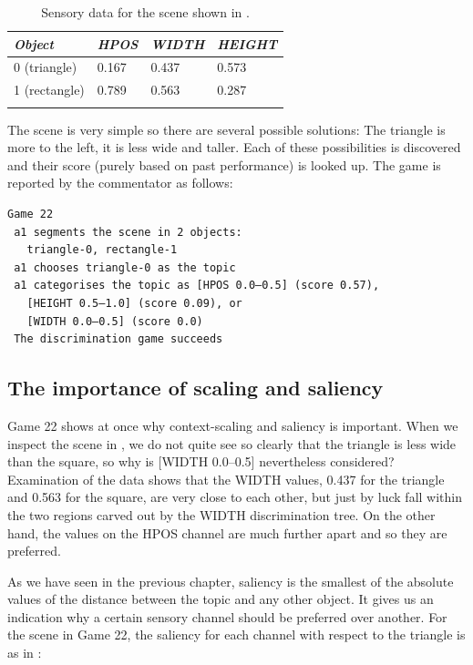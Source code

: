 \begin{table}
\begin{center}
\begin{tabular}{ l  l  l  l }
\lsptoprule
{\itshape Object} & {\itshape HPOS} & {\itshape WIDTH} & {\itshape HEIGHT} \\ \midrule
0 (triangle) & 0.167 & 0.437 & 0.573  \\ 
1 (rectangle) & 0.789 & 0.563 & 0.287 \\  
\lspbottomrule
\end{tabular}
\caption{\label{tab:t-game22}Sensory data for the scene shown in .}
\end{center}
\end{table}

The scene is very simple so there are several possible
solutions: The triangle is more to the left, it is less wide 
and taller. Each of these possibilities is discovered
and their score (purely based on past performance) is 
looked up. The game is reported by the commentator
as follows: 
\begin{verbatim}
Game 22
 a1 segments the scene in 2 objects:  
   triangle-0, rectangle-1
 a1 chooses triangle-0 as the topic 
 a1 categorises the topic as [HPOS 0.0–0.5] (score 0.57), 
   [HEIGHT 0.5–1.0] (score 0.09), or 
   [WIDTH 0.0–0.5] (score 0.0) 
 The discrimination game succeeds
\end{verbatim}

\subsection{The importance of scaling and saliency}

Game 22 shows at once why context-scaling 
and saliency is important. When we inspect the scene in 
, we do not quite see so clearly 
that the triangle is less wide than the square, so why
is [WIDTH 0.0–0.5] 
nevertheless considered? Examination of the data shows
that the WIDTH values, 0.437 for the triangle
and 0.563 for the square, are very close 
to each other, but just by luck fall within 
the two regions carved out by the WIDTH discrimination
tree. On the other hand, the values on the HPOS channel 
are much further apart and so they are preferred. 

As we have seen in the previous chapter, 
saliency is the smallest of the absolute values     
of the distance between the topic and any
other object. It gives us an indication why 
a certain sensory channel should be preferred
over another. For the scene in Game 22, the saliency for each channel with 
respect to the triangle is as in : 

